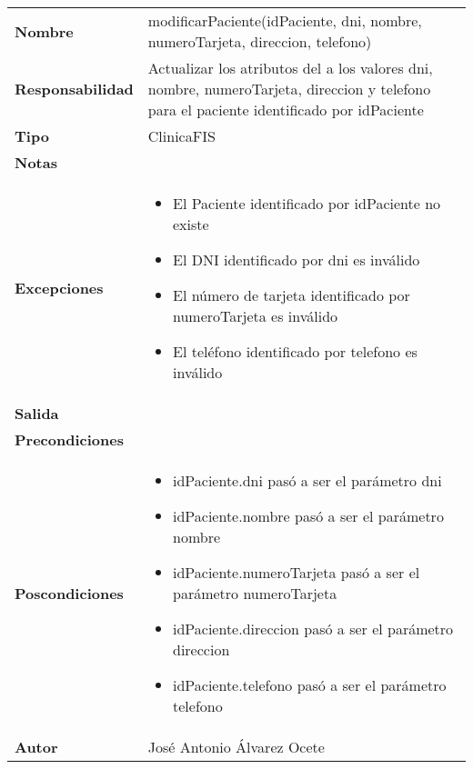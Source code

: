 \documentclass[11pt,a4paper]{article}
\newenvironment{itemizenomargins}
    {\begin{minipage}[t]{1\linewidth}\begin{itemize}}
    {\end{itemize}\end{minipage}}
\begin{document}
\begin{table}[H]
	\centering
	\label{my-label}
	\begin{tabularx}{\textwidth}{l|X}
		\textbf{Nombre}          & modificarPaciente(idPaciente, dni, nombre, numeroTarjeta, direccion, telefono) \\
		\textbf{Responsabilidad} & Actualizar los atributos del a los valores dni, nombre, numeroTarjeta, direccion y telefono para el paciente identificado por idPaciente \\
		\textbf{Tipo}            & ClinicaFIS \\
		\textbf{Notas}           &  \\
		\textbf{Excepciones}     & 
		\begin{itemizenomargins}
			\item El Paciente identificado por idPaciente no existe
			\item El DNI identificado por dni es inválido
			\item El número de tarjeta identificado por numeroTarjeta es inválido
			\item El teléfono identificado por telefono es inválido
		\end{itemizenomargins}\\
		\textbf{Salida}          &  \\
		\textbf{Precondiciones}  &  \\
		\textbf{Poscondiciones}  & \begin{itemizenomargins}
			\item idPaciente.dni pasó a ser el parámetro dni
			\item idPaciente.nombre pasó a ser el parámetro nombre
			\item idPaciente.numeroTarjeta pasó a ser el parámetro numeroTarjeta
			\item idPaciente.direccion pasó a ser el parámetro direccion
			\item idPaciente.telefono pasó a ser el parámetro telefono
		\end{itemizenomargins}\\
		\textbf{Autor}           & José Antonio Álvarez Ocete
	\end{tabularx}
\end{table}
\end{document}
